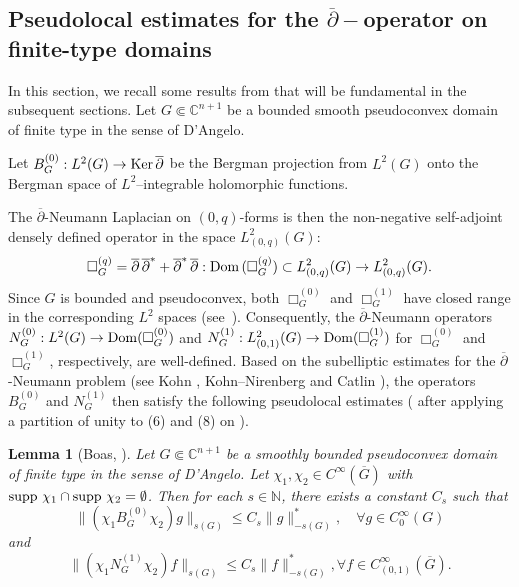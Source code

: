 \documentclass[a4paper,centertags,oneside,12pt]{amsart}
\newcommand{\ddbar}{\overline\partial}
\newcommand{\To}{\rightarrow}
\newtheorem{lemma}[theorem]{Lemma}
\numberwithin{equation}{section}
\begin{document}
\subsection{Pseudolocal estimates for the $\overline\partial-$operator on finite-type domains}
In this section, we recall some results from \cite{Bo87b} that will be fundamental in the subsequent sections. Let $G \Subset \mathbb{C}^{n+1}$ be a bounded smooth pseudoconvex domain of finite type in the sense of D'Angelo.

Let 
$B_{G}^{(0)}: L^2(G)\rightarrow{\rm Ker\,}\ddbar$
be the Bergman projection from $L^2(G)$ onto the Bergman space of $L^2$--integrable holomorphic functions. 

The $\ddbar$-Neumann Laplacian on $(0, q)$-forms is then 
the non-negative self-adjoint densely defined  operator in the space 
$L^2_{(0,q)}(G)$:
\begin{equation*} \label{e-gue190312syd}
\Box_G^{(q)}=\ddbar\,\ddbar^*+\ddbar^*\,\ddbar: 
{\rm Dom\,}(\Box_G^{(q)})\subset L^2_{(0,q)}(G)\To L^2_{(0,q)}(G).
\end{equation*}
Since $G$ is bounded and pseudoconvex, both $\Box_{G}^{(0)}$ and $\Box_{G}^{(1)}$ have closed range in the corresponding $L^2$ spaces (see~\cite{Ho65, CS01}).
Consequently, the $\overline\partial$-Neumann operators $N_{G}^{(0)}: L^2(G)\rightarrow{\rm Dom}(\Box_{G}^{(0)})$ and $N_{G}^{(1)}: L^2_{(0,1)}(G)\rightarrow{\rm Dom}(\Box_{G}^{(1)})$ for $\Box^{(0)}_{G}$ and $\Box^{(1)}_{G}$, respectively, are well-defined. Based on the subelliptic estimates for the $\overline\partial$-Neumann problem (see Kohn \cite{Ko64, Ko63}, Kohn--Nirenberg \cite{KN65} and Catlin \cite{Ca87}), the operators $B_{G}^{(0)}$ and $N_{G}^{(1)}$ then satisfy the following pseudolocal estimates ( after applying a partition of unity to (6) and (8)  on \cite[Page 497]{Bo87b}).
\begin{lemma}[Boas, \cite{Bo87a} \cite{Bo87b}]
Let $G \Subset \mathbb{C}^{n+1}$ be a smoothly bounded  pseudoconvex domain of finite type in the sense of D'Angelo.  Let $\chi_1, \chi_2\in C^\infty(\overline G)$ with ${\rm supp}~\chi_1\cap{\rm supp}~\chi_2=\emptyset$. Then for each $s\in\mathbb N$,  there exists a constant $C_s$ such that
\begin{equation}\label{off diagonal of B}
        \|(\chi_1 B^{(0)}_{G}\chi_2)g\|_{s(G)} \leq C_s \|g\|^\ast_{-s(G)}, \quad \forall g \in C_0^\infty(G)
    \end{equation}
    and
\begin{equation}\label{strongl local estimate of N}
    \|(\chi_1 N_{G}^{(1)}\chi_2) f\|_{s(G)}\leq C_s\|f\|^\ast_{-s(G)}, \forall f\in C^\infty_{(0, 1)}(\overline G). 
\end{equation}
\end{lemma}
\end{document}
